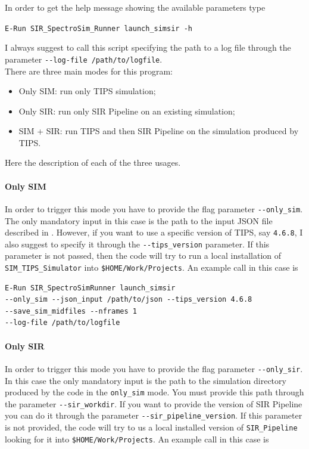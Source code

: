 In order to get the help message showing the available parameters type

\begin{center}
\verb+E-Run SIR_SpectroSim_Runner launch_simsir -h+
\end{center}

I always suggest to call this script specifying the path to a log file through the parameter \verb+--log-file /path/to/logfile+.\\
There are three main modes for this program:

\begin{itemize}
\item Only SIM: run only TIPS simulation;
\item Only SIR: run only SIR Pipeline on an existing simulation;
\item SIM + SIR: run TIPS and then SIR Pipeline on the simulation produced by TIPS.
\end{itemize}

Here the description of each of the three usages.

\paragraph{Only SIM}
In order to trigger this mode you have to provide the flag parameter \verb+--only_sim+. The only mandatory input in this case is the path to the input JSON file described in . However, if you want to use a specific version of TIPS, say \verb+4.6.8+, I also suggest to specify it through the \verb+--tips_version+ parameter. If this parameter is not passed, then the code will try to run a local installation of \verb+SIM_TIPS_Simulator+ into \verb+$HOME/Work/Projects+. An example call in this case is

\begin{verbatim}
E-Run SIR_SpectroSimRunner launch_simsir 
--only_sim --json_input /path/to/json --tips_version 4.6.8
--save_sim_midfiles --nframes 1
--log-file /path/to/logfile
\end{verbatim}

\paragraph{Only SIR}
In order to trigger this mode you have to provide the flag parameter \verb+--only_sir+. In this case the only mandatory input is the path to the simulation directory produced by the code in the \verb+only_sim+ mode. You must provide this path through the parameter \verb+--sir_workdir+. If you want to provide the version of SIR Pipeline you can do it through the parameter \verb+--sir_pipeline_version+. If this parameter is not provided, the code will try to us a local installed version of \verb+SIR_Pipeline+ looking for it into \verb+$HOME/Work/Projects+.
An example call in this case is

